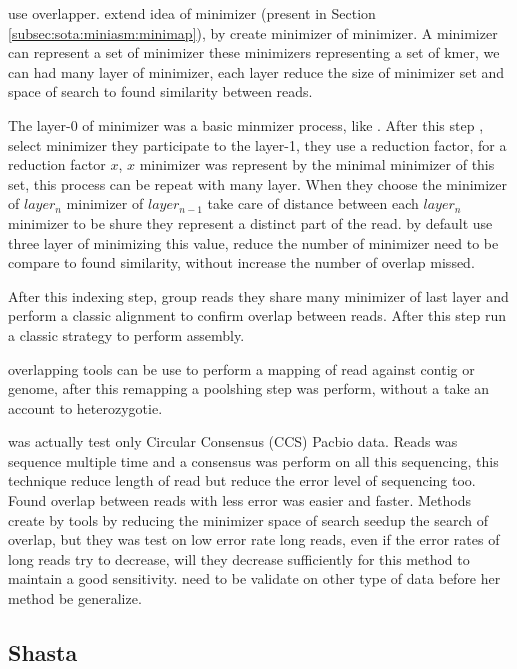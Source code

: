 \documentclass[main]{subfiles}
\begin{document}
\peregrine \cite{Peregrine} use \shimmer overlapper. \shimmer extend idea of minimizer (present in Section \ref{subsec:sota:miniasm:minimap}), by create minimizer of minimizer. A minimizer can represent a set of minimizer these minimizers representing a set of kmer, we can had many layer of minimizer, each layer reduce the size of minimizer set and space of search to found similarity between reads.

The layer-0 of minimizer was a basic minmizer process, like \minimap. After this step \shimmer, select minimizer they participate to the layer-1, they use a reduction factor, for a reduction factor $x$, $x$ minimizer was represent by the minimal minimizer of this set, this process can be repeat with many layer. When they choose the minimizer of $layer_n$ minimizer of $layer_{n-1}$ \shimmer take care of distance between each $layer_n$ minimizer to be shure they represent a distinct part of the read.  \shimmer by default use three layer of minimizing this value, reduce the number of minimizer need to be compare to found similarity, without increase the number of overlap missed.

After this indexing step, \shimmer group reads they share many minimizer of last layer and perform a classic alignment to confirm overlap between reads. After this step \peregrine run a classic \OLC strategy to perform assembly.

\shimmer overlapping tools can be use to perform a mapping of read against contig or genome, after this remapping a poolshing step was perform, without a take an account to heterozygotie.

\peregrine was actually test only Circular Consensus (CCS) Pacbio data. Reads was sequence multiple time and a consensus was perform on all this sequencing, this technique reduce length of read but reduce the error level of sequencing too. Found overlap between reads with less error was easier and faster. Methods create by \peregrine tools by reducing the minimizer space of search seedup the search of overlap, but they was test on low error rate long reads, even if the error rates of long reads try to decrease, will they decrease sufficiently for this method to maintain a good sensitivity. \peregrine need to be validate on other type of data before her method be generalize.

\subsection{Shasta}
\end{document}
